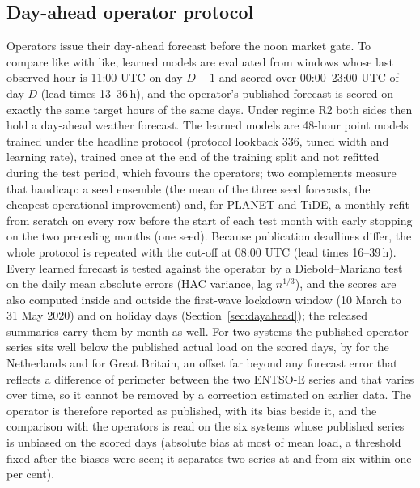 \subsection{Day-ahead operator protocol}
\label{sec:dayahead-proto}
Operators issue their day-ahead forecast before the noon market gate. To compare like with
like, learned models are evaluated from windows whose last observed hour is 11:00 UTC on day
$D-1$ and scored over 00:00--23:00 UTC of day $D$ (lead times 13--36\,h), and the operator's
published forecast is scored on exactly the same target hours of the same days. Under regime
R2 both sides then hold a day-ahead weather forecast. The learned models are 48-hour point models trained under the headline protocol (protocol
lookback 336, tuned width and learning rate),
trained once at the end of the training split and not refitted during the test period, which
favours the operators; two complements measure that handicap: a seed ensemble (the mean of the
three seed forecasts, the cheapest operational improvement) and, for PLANET and TiDE, a monthly
refit from scratch on every row before the start of each test month with early stopping on the
two preceding months (one seed). Because publication deadlines differ, the whole protocol is
repeated with the cut-off at 08:00 UTC (lead times 16--39\,h). Every learned forecast is tested
against the operator by a Diebold--Mariano test on the daily mean absolute errors (HAC variance,
lag $n^{1/3}$), and the scores are also computed inside and outside the first-wave lockdown window (10 March
to 31 May 2020) and on holiday days (Section~\ref{sec:dayahead}); the released summaries carry
them by month as well. For two systems the
published operator series sits well below the published actual load on the scored days, by
 for the Netherlands and  for Great
Britain, an offset far beyond any forecast error that reflects a difference of perimeter
between the two ENTSO-E series and that varies over time, so it cannot be removed by a
correction estimated on earlier data. The operator is therefore reported as published, with
its bias beside it, and the comparison with the operators is read on the six systems whose
published series is unbiased on the scored days (absolute bias at most 
of mean load, a threshold fixed after the biases were seen; it separates two series at
 and  from six within one per cent).

